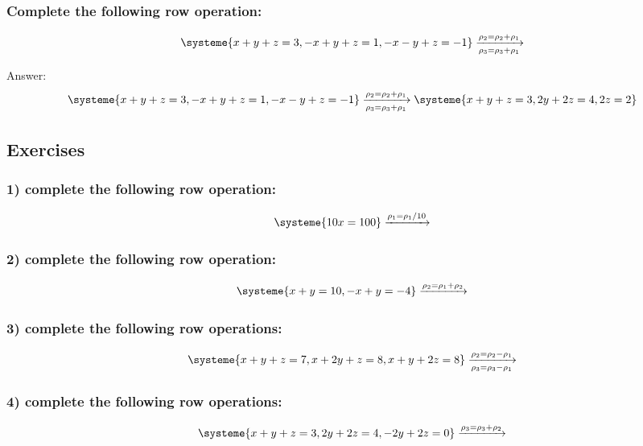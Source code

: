 \documentclass[a4paper,twoside,12pt]{memoir}  %
\begin{document}
\subsubsection{Complete the following row operation:}
\begin{equation*}
  \systeme{
    x + y + z = 3,
   -x + y + z = 1,
   -x - y + z = -1
  }
  \xrightarrow[\rho_3 = \rho_3 + \rho_1]{\rho_2 = \rho_2 + \rho_1}
\end{equation*}

Answer:
\begin{equation*}
  \systeme{
    x + y + z = 3,
   -x + y + z = 1,
   -x - y + z = -1
  }
  \xrightarrow[\rho_3 = \rho_3 + \rho_1]{\rho_2 = \rho_2 + \rho_1}
  \systeme{
    x + y + z = 3,
       2y +2z = 4,
           2z = 2
  }
\end{equation*}

\subsection{Exercises}
\subsubsection{1) complete the following row operation:}
\begin{equation*}
  \systeme{
    10x = 100
  }
  \xrightarrow{\rho_1 = \rho_1/10}
\end{equation*}

\subsubsection{2) complete the following row operation:}
\begin{equation*}
  \systeme{
    x + y = 10,
    -x + y = -4
  }
  \xrightarrow{\rho_2 = \rho_1 + \rho_2}
\end{equation*}

\subsubsection{3) complete the following row operations:}
\begin{equation*}
  \systeme{
    x + y +  z = 7,
    x + 2y + z = 8,
    x + y + 2z = 8
  }
  \xrightarrow[\rho_3 = \rho_3 - \rho_1]{\rho_2 = \rho_2 - \rho_1}
\end{equation*}

\subsubsection{4) complete the following row operations:}
\begin{equation*}
  \systeme{
    x + y +  z = 3,
       2y + 2z = 4,
      -2y + 2z = 0
  }
  \xrightarrow{\rho_3 = \rho_3 + \rho_2}
\end{equation*}
\end{document}
